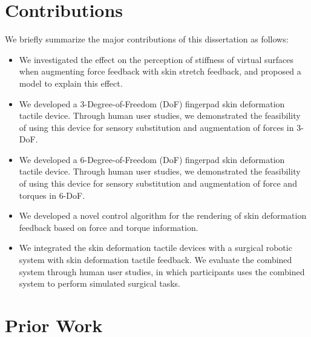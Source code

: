 \section{Contributions}
We briefly summarize the major contributions of this dissertation as follows:
\begin{itemize}
\item We investigated the effect on the perception of stiffness of virtual surfaces when augmenting force feedback with skin stretch feedback, and proposed a model to explain this effect.
\item We developed a 3-Degree-of-Freedom (DoF) fingerpad skin deformation tactile device. Through human user studies, we demonstrated the feasibility of using this device for sensory substitution and augmentation of forces in 3-DoF.
\item We developed a 6-Degree-of-Freedom (DoF) fingerpad skin deformation tactile device. Through human user studies, we demonstrated the feasibility of using this device for sensory substitution and augmentation of force and torques in 6-DoF.
\item We developed a novel control algorithm for the rendering of skin deformation feedback based on force and torque information.
\item We integrated the skin deformation tactile devices with a surgical robotic system with skin deformation tactile feedback. We evaluate the combined system through human user studies, in which participants uses the combined system to perform simulated surgical tasks.
\end{itemize}

\section{Prior Work}


